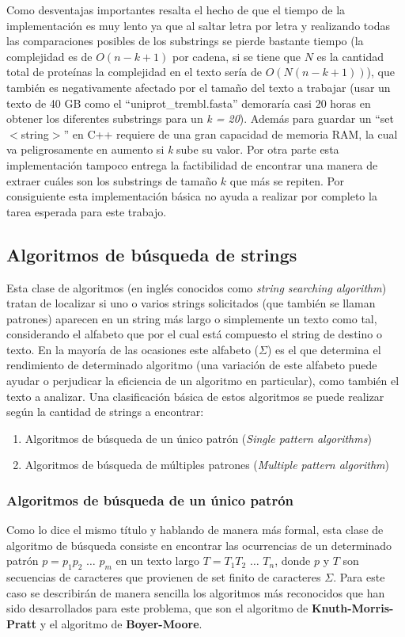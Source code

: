 Como desventajas importantes resalta el hecho de que el tiempo de la implementación es muy lento ya que al saltar letra por letra y realizando todas las comparaciones posibles de los substrings se pierde bastante tiempo (la complejidad es de $O(n-k+1)$ por cadena, si se tiene que $N$ es la cantidad total de proteínas la complejidad en el texto sería de $O(N(n-k+1))$), que también es negativamente afectado por el tamaño del texto a trabajar (usar un texto de 40 GB como el ``uniprot\_trembl.fasta'' demoraría casi 20 horas en obtener los diferentes substrings para un \textit{k = 20}). Además para guardar un ``set$<$string$>$'' en C++ requiere de una gran capacidad de memoria RAM, la cual va peligrosamente en aumento si \textit{k} sube su valor. Por otra parte esta implementación tampoco entrega la factibilidad de encontrar una manera de extraer cuáles son los substrings de tamaño $k$ que más se repiten. Por consiguiente esta implementación básica no ayuda a realizar por completo la tarea esperada para este trabajo. 


\subsection{Algoritmos de búsqueda de strings}

Esta clase de algoritmos (en inglés conocidos como \textit{string searching algorithm}) tratan de localizar si uno o varios strings solicitados (que también se llaman patrones) aparecen en un string más largo o simplemente un texto como tal, considerando el alfabeto que por el cual está compuesto el string de destino o texto. En la mayoría de las ocasiones este alfabeto ($\Sigma$) es el que determina el rendimiento de determinado algoritmo (una variación de este alfabeto puede ayudar o perjudicar la eficiencia de un algoritmo en particular), como también el texto a analizar.
Una clasificación básica de estos algoritmos se puede realizar según la cantidad de strings a encontrar:
\begin{enumerate}
\item Algoritmos de búsqueda de un único patrón (\textit{Single pattern algorithms})
\item Algoritmos de búsqueda de múltiples patrones (\textit{Multiple pattern algorithm})
\end{enumerate}

\subsubsection{Algoritmos de búsqueda de un único patrón}
Como lo dice el mismo título y hablando de manera más formal, esta clase de algoritmo de búsqueda consiste en encontrar las ocurrencias de un determinado patrón\cite{stringmatching} $p=p_{1}p_{2}$ $\ldots$ $p_{m}$ en un texto largo $T=T_{1}T_{2}$ $\ldots$ $T_{n}$, donde $p$ y $T$ son secuencias de caracteres que provienen de set finito de caracteres $\Sigma$.
Para este caso se describirán de manera sencilla los algoritmos más reconocidos que han sido desarrollados para este problema, que son el algoritmo de \textbf{Knuth-Morris-Pratt} y el algoritmo de \textbf{Boyer-Moore}.

